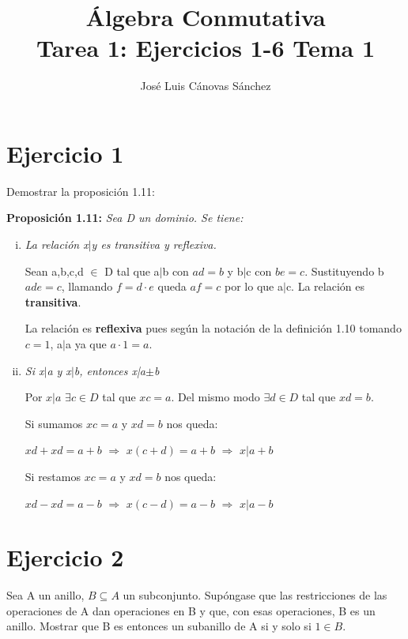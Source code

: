 \documentclass[10pt,a4paper]{article}
\author{José Luis Cánovas Sánchez}
\title{Álgebra Conmutativa\\Tarea 1: Ejercicios 1-6 Tema 1}
\begin{document}
	\maketitle
	
	\section{Ejercicio 1}
	
	Demostrar la proposición 1.11:
	
	\par
	
	\textbf{Proposición 1.11:} \textit{Sea D un dominio. Se tiene:}
	
	\begin{enumerate}[(i)]
		\item \textit{La relación x$\vert$y es transitiva y reflexiva.}
		
		Sean a,b,c,d $\in$ D tal que a$\vert$b con $ad=b$ y b$\vert$c con $be=c$. Sustituyendo b $ade=c$, llamando $f=d\cdot e$ queda $af=c$ por lo que a$\vert$c. La relación es \textbf{transitiva}.
		
		La relación es \textbf{reflexiva} pues según la notación de la definición 1.10 tomando $c=1$, a$\vert$a ya que $a\cdot1=a$.
		
		\item \textit{Si x$\vert$a y x$\vert$b, entonces x|a$\pm$b}
		
		Por $x\vert a$ $\exists c \in D$ tal que $xc=a$. Del mismo modo $\exists d \in D$ tal que $xd=b$.
		
		Si sumamos $xc=a$ y  $xd=b$ nos queda:
		
		  $xd + xd= a + b$ $\Rightarrow$ $x(c+d)=a+b$ $\Rightarrow$ $x\vert a+b$
		  
	    Si restamos $xc=a$ y  $xd=b$ nos queda:
		  
		  $xd - xd= a - b$ $\Rightarrow$ $x(c-d)=a-b$ $\Rightarrow$ $x\vert a-b$
		
	\end{enumerate}
	
	
	\section{Ejercicio 2}
	
	Sea A un anillo, $B\subseteq A$ un subconjunto. Supóngase que las restricciones de las operaciones de A dan operaciones en B y que, con esas operaciones, B es un anillo. Mostrar que B es entonces un subanillo de A si y solo si $1 \in B$.
	
\end{document}
